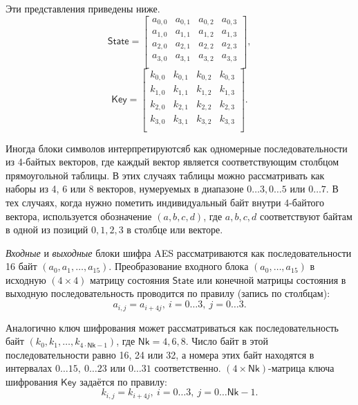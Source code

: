 Эти представления приведены ниже.
\[
    \mathsf{State} = \left[ \begin{array}{cccc}
        a_{0,0} & a_{0,1} & a_{0,2} & a_{0,3} \\
        a_{1,0} & a_{1,1} & a_{1,2} & a_{1,3} \\
        a_{2,0} & a_{2,1} & a_{2,2} & a_{2,3} \\
        a_{3,0} & a_{3,1} &a_{3,2} & a_{3,3}  \\
    \end{array} \right],
\] \[
    \mathsf{Key} = \left[ \begin{array}{cccc}
        k_{0,0} & k_{0,1} & k_{0,2} & k_{0,3} \\
        k_{1,0} & k_{1,1} & k_{1,2} & k_{1,3} \\
        k_{2,0} & k_{2,1} & k_{2,2} & k_{2,3} \\
        k_{3,0} & k_{3,1} & k_{3,2} & k_{3,3} \\
    \end{array} \right].
\]

Иногда блоки символов интерпретируютсяб как одномерные последовательности из 4-байтых векторов, где каждый вектор является соответствующим столбцом прямоугольной таблицы. В этих случаях таблицы можно рассматривать как наборы из 4, 6 или 8 векторов, нумеруемых в диапазоне $0 \dots 3, 0 \dots 5$ или $0 \dots 7$. В тех случаях, когда нужно пометить индивидуальный байт внутри 4-байтого вектора, используется обозначение $(a, b, c, d)$, где $a, b, c, d$ соответствуют байтам в одной из позиций $0, 1, 2, 3$ в столбце или векторе.

\textit{Входные} и \textit{выходные} блоки шифра AES рассматриваются как последовательности 16 байт $(a_0, a_1, \dots, a_{15})$. Преобразование входного блока $(a_0, \dots, a_{15})$ в исходную $(4 \times 4)$ матрицу состояния $\mathsf{State}$ или конечной матрицы состояния в выходную последовательность проводится по правилу (запись по столбцам):
    \[ a_{i,j} = a_{i + 4j}, ~ i = 0 \dots 3, ~ j = 0 \dots 3. \]

Аналогично ключ шифрования может рассматриваться как последовательность байт $(k_0, k_1, \dots, k_{4 \cdot \mathsf{Nk} - 1})$, где $\mathsf{Nk} = 4, 6, 8$. Число байт в этой последовательности равно 16, 24 или 32, а номера этих байт находятся в интервалах $0 \dots 15, ~ 0 \dots 23$ или $0 \dots 31$ соответственно. $(4 \times \mathsf{Nk})$-матрица ключа шифрования $\mathsf{Key}$ задаётся по правилу:
    \[ k_{i,j} = k_{i + 4j}, ~ i = 0 \dots 3, ~ j = 0 \dots \mathsf{Nk} - 1. \]

